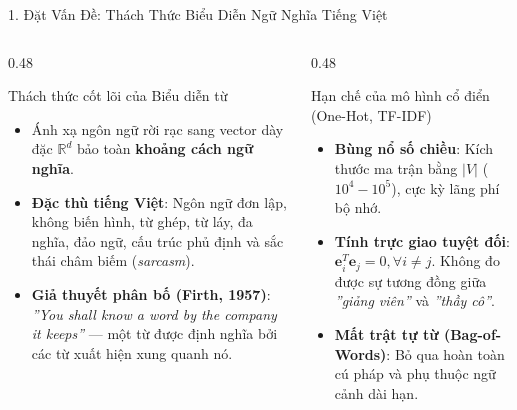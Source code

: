 \documentclass[aspectratio=169, 10pt]{beamer}
\begin{document}
\begin{frame}{1. Đặt Vấn Đề: Thách Thức Biểu Diễn Ngữ Nghĩa Tiếng Việt}
  \begin{columns}[T, onlytextwidth]
    \begin{column}{0.48\textwidth}
      \begin{block}{Thách thức cốt lõi của Biểu diễn từ}
        \fontsize{8}{10.5}\selectfont
        \begin{itemize}\setlength{\itemsep}{0.25em}
          \item Ánh xạ ngôn ngữ rời rạc sang vector dày đặc $\mathbb{R}^d$ bảo toàn \textbf{khoảng cách ngữ nghĩa}.
          \item \textbf{Đặc thù tiếng Việt}: Ngôn ngữ đơn lập, không biến hình, từ ghép, từ láy, đa nghĩa, đảo ngữ, cấu trúc phủ định và sắc thái châm biếm (\textit{sarcasm}).
          \item \textbf{Giả thuyết phân bố (Firth, 1957)}: \textit{''You shall know a word by the company it keeps''} — một từ được định nghĩa bởi các từ xuất hiện xung quanh nó.
        \end{itemize}
      \end{block}
    \end{column}
    \hfill
    \begin{column}{0.48\textwidth}
      \begin{alertblock}{Hạn chế của mô hình cổ điển (One-Hot, TF-IDF)}
        \fontsize{8}{10.5}\selectfont
        \begin{itemize}\setlength{\itemsep}{0.25em}
          \item \textbf{Bùng nổ số chiều}: Kích thước ma trận bằng $|V|$ ($10^4 - 10^5$), cực kỳ lãng phí bộ nhớ.
          \item \textbf{Tính trực giao tuyệt đối}: $\mathbf{e}_i^T \mathbf{e}_j = 0, \forall i \ne j$. Không đo được sự tương đồng giữa \textit{''giảng viên''} và \textit{''thầy cô''}.
          \item \textbf{Mất trật tự từ (Bag-of-Words)}: Bỏ qua hoàn toàn cú pháp và phụ thuộc ngữ cảnh dài hạn.
        \end{itemize}
      \end{alertblock}
    \end{column}
  \end{columns}
\end{frame}
\end{document}

